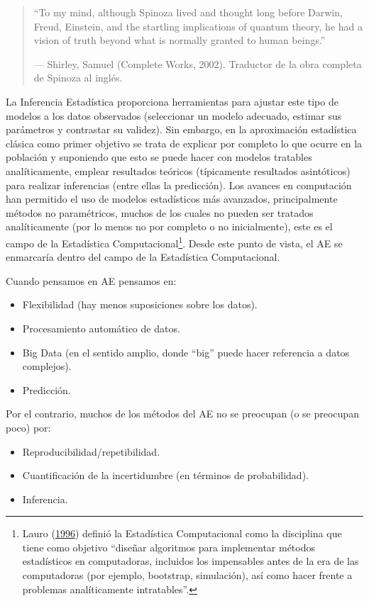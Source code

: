 \documentclass[
  spanish,
]{book}
\theoremstyle{break}
\theoremstyle{definition}
\theoremstyle{definition}
\theoremstyle{definition}
\theoremstyle{remark}
\begin{document}
\begin{quote}
``To my mind, although Spinoza lived and thought long before Darwin, Freud, Einstein, and the startling implications of quantum theory, he had a vision of truth beyond what is normally granted to human beings.''

--- Shirley, Samuel (Complete Works, 2002). Traductor de la obra completa de Spinoza al inglés.
\end{quote}

La Inferencia Estadística proporciona herramientas para ajustar este tipo de modelos a los datos observados (seleccionar un modelo adecuado, estimar sus parámetros y contrastar su validez).
Sin embargo, en la aproximación estadística clásica como primer objetivo se trata de explicar por completo lo que ocurre en la población y suponiendo que esto se puede hacer con modelos tratables analíticamente, emplear resultados teóricos (típicamente resultados asintóticos) para realizar inferencias (entre ellas la predicción).
Los avances en computación han permitido el uso de modelos estadísticos más avanzados, principalmente métodos no paramétricos, muchos de los cuales no pueden ser tratados analíticamente (por lo menos no por completo o no inicialmente), este es el campo de la Estadística Computacional\footnote{Lauro (\protect\hyperlink{ref-lauro1996computational}{1996}) definió la Estadística Computacional como la disciplina que tiene como objetivo ``diseñar algoritmos para implementar métodos estadísticos en computadoras, incluidos los impensables antes de la era de las computadoras (por ejemplo, bootstrap, simulación), así como hacer frente a problemas analíticamente intratables''.}. Desde este punto de vista, el AE se enmarcaría dentro del campo de la Estadística Computacional.

Cuando pensamos en AE pensamos en:

\begin{itemize}
\item
  Flexibilidad (hay menos suposiciones sobre los datos).
\item
  Procesamiento automático de datos.
\item
  Big Data (en el sentido amplio, donde ``big'' puede hacer referencia a datos complejos).
\item
  Predicción.
\end{itemize}

Por el contrario, muchos de los métodos del AE no se preocupan (o se preocupan poco) por:

\begin{itemize}
\item
  Reproducibilidad/repetibilidad.
\item
  Cuantificación de la incertidumbre (en términos de probabilidad).
\item
  Inferencia.
\end{itemize}
\end{document}
